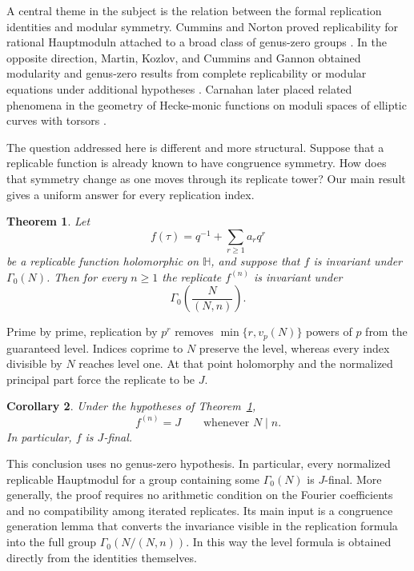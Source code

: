 \documentclass[12pt]{amsart}
\newtheorem{thm}{Theorem}[section]
\newtheorem{cor}[thm]{Corollary}
\theoremstyle{definition}
\theoremstyle{remark}
\numberwithin{equation}{section}
\newcommand{\Hh}{\mathbb H}
\begin{document}
A central theme in the subject is the relation between the formal replication
identities and modular symmetry.  Cummins and Norton proved replicability for
rational Hauptmoduln attached to a broad class of genus-zero groups
\cite{cummins-norton}.  In the opposite direction, Martin, Kozlov, and Cummins
and Gannon obtained modularity and genus-zero results from complete
replicability or modular equations under additional hypotheses
\cite{martin,kozlov,cummins-gannon}.  Carnahan later placed related phenomena
in the geometry of Hecke-monic functions on moduli spaces of elliptic curves
with torsors \cite{carnahan}.

The question addressed here is different and more structural.  Suppose that a
replicable function is already known to have congruence symmetry.  How does
that symmetry change as one moves through its replicate tower?  Our main
result gives a uniform answer for every replication index.

\begin{thm}\label{thm:intro-descent}
Let
\[
f(\tau)=q^{-1}+\sum_{r\geq1}a_rq^r
\]
be a replicable function holomorphic on $\Hh$, and suppose that $f$ is invariant under $\Gamma_0(N)$. Then for every $n\geq1$ the replicate $f^{(n)}$ is invariant under
\[
\Gamma_0\!\left(\frac{N}{(N,n)}\right).
\]
\end{thm}

Prime by prime, replication by $p^r$ removes
$\min\{r,v_p(N)\}$ powers of $p$ from the guaranteed level.  Indices coprime
to $N$ preserve the level, whereas every index divisible by $N$ reaches level
one.  At that point holomorphy and the normalized principal part force the
replicate to be $J$.

\begin{cor}\label{cor:intro-J}
Under the hypotheses of Theorem~\ref{thm:intro-descent},
\[
f^{(n)}=J
\qquad\text{whenever }N\mid n.
\]
In particular, $f$ is $J$-final.
\end{cor}

This conclusion uses no genus-zero hypothesis.  In particular, every
normalized replicable Hauptmodul for a group containing some $\Gamma_0(N)$ is
$J$-final.  More generally, the proof requires no arithmetic condition on the
Fourier coefficients and no compatibility among iterated replicates.  Its main
input is a congruence generation lemma that converts the invariance visible in
the replication formula into the full group
$\Gamma_0(N/(N,n))$.  In this way the level formula is obtained directly from
the identities themselves.
\end{document}
